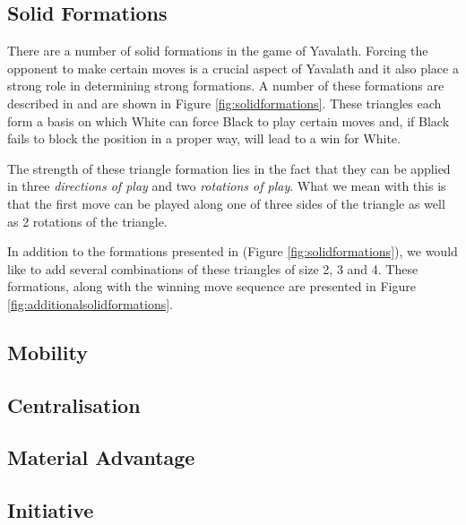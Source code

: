 \documentclass[11pt]{article}
\begin{document}
\subsection{Solid Formations}
\label{-subsec:solidformations}
There are a number of solid formations in the game of Yavalath. Forcing the opponent to make certain moves is a crucial aspect of Yavalath and it also place a strong role in determining strong formations. A number of these formations are described in \cite{browne2011evolutionary} and are shown in Figure \ref{fig:solidformations}. These triangles each form a basis on which White can force Black to play certain moves and, if Black fails to block the position in a proper way, will lead to a win for White.



The strength of these triangle formation lies in the fact that they can be applied in three \emph{directions of play} and two \emph{rotations of play}. What we mean with this is that the first move can be played along one of three sides of the triangle as well as 2 rotations of the triangle.

In addition to the formations presented in \cite{browne2011evolutionary} (Figure \ref{fig:solidformations}), we would like to add several combinations of these triangles of size 2, 3 and 4. These formations, along with the winning move sequence are presented in Figure \ref{fig:additionalsolidformations}.



\subsection{Mobility}
\label{-subsec:mobility}

\subsection{Centralisation}
\label{-subsec:centralisation}



\subsection{Material Advantage}
\label{-subsec:materialadvantage}

\subsection{Initiative}
\label{-subsec:initiative}


	\nocite{*}
	\printbibliography
\end{document}
